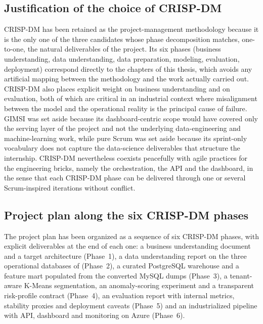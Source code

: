 \subsection{Justification of the choice of CRISP-DM}
CRISP-DM has been retained as the project-management methodology because it is the only one of the three candidates whose phase decomposition matches, one-to-one, the natural deliverables of the project. Its six phases (business understanding, data understanding, data preparation, modeling, evaluation, deployment) correspond directly to the chapters of this thesis, which avoids any artificial mapping between the methodology and the work actually carried out. CRISP-DM also places explicit weight on business understanding and on evaluation, both of which are critical in an industrial context where misalignment between the model and the operational reality is the principal cause of failure. GIMSI was set aside because its dashboard-centric scope would have covered only the serving layer of the project and not the underlying data-engineering and machine-learning work, while pure Scrum was set aside because its sprint-only vocabulary does not capture the data-science deliverables that structure the internship. CRISP-DM nevertheless coexists peacefully with agile practices for the engineering bricks, namely the orchestration, the API and the dashboard, in the sense that each CRISP-DM phase can be delivered through one or several Scrum-inspired iterations without conflict.

\subsection{Project plan along the six CRISP-DM phases}
The project plan has been organized as a sequence of six CRISP-DM phases, with explicit deliverables at the end of each one: a business understanding document and a target architecture (Phase~1), a data understanding report on the three operational databases of \hostorg{} (Phase~2), a curated PostgreSQL warehouse and a feature mart populated from the converted MySQL dumps (Phase~3), a tenant-aware K-Means segmentation, an anomaly-scoring experiment and a transparent risk-profile contract (Phase~4), an evaluation report with internal metrics, stability proxies and deployment caveats (Phase~5) and an industrialized pipeline with API, dashboard and monitoring on Azure (Phase~6).

